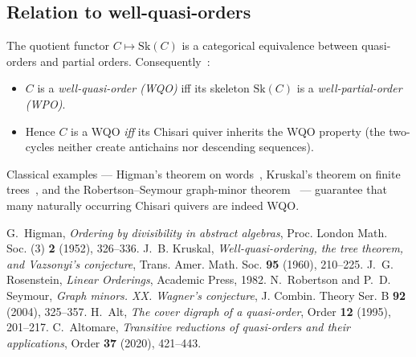 \documentclass{article}
\begin{document}
\subsection*{Relation to well-quasi-orders}
The quotient functor $C\mapsto\mathrm{Sk}(C)$ is a categorical equivalence between quasi-orders and partial orders.  Consequently~\cite{Rosenstein1982}:
\begin{itemize}
  \item $C$ is a \emph{well-quasi-order (WQO)} iff its skeleton $\mathrm{Sk}(C)$ is a \emph{well-partial-order (WPO)}.
  \item Hence $C$ is a WQO \emph{iff} its Chisari quiver inherits the WQO property (the two-cycles neither create antichains nor descending sequences).
\end{itemize}
Classical examples --- Higman’s theorem on words~\cite{Higman1952}, Kruskal’s theorem on finite trees~\cite{Kruskal1960}, and the Robertson–Seymour graph-minor theorem~\cite{RobertsonSeymour2004} --- guarantee that many naturally occurring Chisari quivers are indeed WQO.

\begin{thebibliography}{99}
 G.~Higman, \emph{Ordering by divisibility in abstract algebras}, Proc. London Math. Soc. (3) \textbf{2} (1952), 326–336.
 J.~B. Kruskal, \emph{Well-quasi-ordering, the tree theorem, and Vazsonyi’s conjecture}, Trans. Amer. Math. Soc. \textbf{95} (1960), 210–225.
 J.~G. Rosenstein, \emph{Linear Orderings}, Academic Press, 1982.
 N.~Robertson and P.~D. Seymour, \emph{Graph minors. XX. Wagner’s conjecture}, J. Combin. Theory Ser. B \textbf{92} (2004), 325–357.
 H.~Alt, \emph{The cover digraph of a quasi-order}, Order \textbf{12} (1995), 201–217.
 C.~Altomare, \emph{Transitive reductions of quasi-orders and their applications}, Order \textbf{37} (2020), 421–443.
\end{thebibliography}
\end{document}
